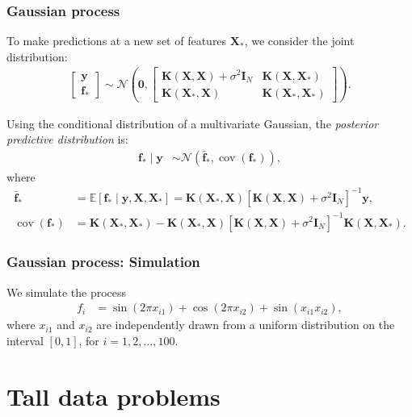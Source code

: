 \documentclass[12pt, compress]{beamer}
\begin{document}
\begin{frame}
	\frametitle{Gaussian process}
To make predictions at a new set of features \( \mathbf{X}_* \), we consider the joint distribution:
\begin{align*}
	\begin{bmatrix}
		\mathbf{y} \\
		\mathbf{f}_*
	\end{bmatrix}
	\sim \mathcal{N}\left(
	\mathbf{0},
	\begin{bmatrix}
		\mathbf{K}(\mathbf{X}, \mathbf{X}) + \sigma^2 \mathbf{I}_N & \mathbf{K}(\mathbf{X}, \mathbf{X}_*) \\
		\mathbf{K}(\mathbf{X}_*, \mathbf{X}) & \mathbf{K}(\mathbf{X}_*, \mathbf{X}_*)
	\end{bmatrix}
	\right).
\end{align*}

Using the conditional distribution of a multivariate Gaussian, the \textit{posterior predictive distribution} \cite{rasmussen2006gaussian} is:
\begin{align*}
	\mathbf{f}_* \mid \mathbf{y} &\sim \mathcal{N}(\bar{\mathbf{f}}_*, \operatorname{cov}(\mathbf{f}_*)),
\end{align*}
where
\begin{align*}
	\bar{\mathbf{f}}_* &= \mathbb{E}[\mathbf{f}_* \mid \mathbf{y}, \mathbf{X}, \mathbf{X}_*] = \mathbf{K}(\mathbf{X}_*, \mathbf{X}) [\mathbf{K}(\mathbf{X}, \mathbf{X}) + \sigma^2 \mathbf{I}_N]^{-1} \mathbf{y}, \\
	\operatorname{cov}(\mathbf{f}_*) &= \mathbf{K}(\mathbf{X}_*, \mathbf{X}_*) - \mathbf{K}(\mathbf{X}_*, \mathbf{X}) [\mathbf{K}(\mathbf{X}, \mathbf{X}) + \sigma^2 \mathbf{I}_N]^{-1} \mathbf{K}(\mathbf{X}, \mathbf{X}_*).
\end{align*}
\end{frame}

\begin{frame}
	\frametitle{Gaussian process: Simulation}
We simulate the process
\begin{align*}
	f_i & = \sin(2\pi x_{i1}) + \cos(2\pi x_{i2}) + \sin(x_{i1} x_{i2}),
\end{align*}
where $x_{i1}$ and $x_{i2}$ are independently drawn from a uniform distribution on the interval $[0, 1]$, for $i = 1, 2, \dots, 100$.
\end{frame}

\section{Tall data problems}
\end{document}

